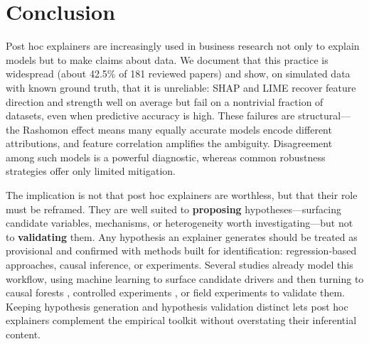 \documentclass[12pt,letterpaper]{article}
\begin{document}
\section{Conclusion}
\label{sec:concl}

Post hoc explainers are increasingly used in business research not only to explain
models but to make claims about data. We document that this practice is widespread
(about 42.5\% of 181 reviewed papers) and show, on simulated data with known ground
truth, that it is unreliable: SHAP and LIME recover feature direction and strength
well on average but fail on a nontrivial fraction of datasets, even when predictive
accuracy is high. These failures are structural---the Rashomon effect means many
equally accurate models encode different attributions, and feature correlation
amplifies the ambiguity. Disagreement among such models is a powerful diagnostic,
whereas common robustness strategies offer only limited mitigation.

The implication is not that post hoc explainers are worthless, but that their role
must be reframed. They are well suited to \textbf{proposing} hypotheses---surfacing
candidate variables, mechanisms, or heterogeneity worth investigating---but not to
\textbf{validating} them. Any hypothesis an explainer generates should be treated as
provisional and confirmed with methods built for identification: regression-based
approaches, causal inference, or experiments. Several studies already model this
workflow, using machine learning to surface candidate drivers and then turning to
causal forests \citep{zhang2023can}, controlled experiments \citep{feng2025ai}, or
field experiments \citep{senoner2022using} to validate them. Keeping
hypothesis generation and hypothesis validation distinct lets post hoc explainers
complement the empirical toolkit without overstating their inferential content.



\end{document}

